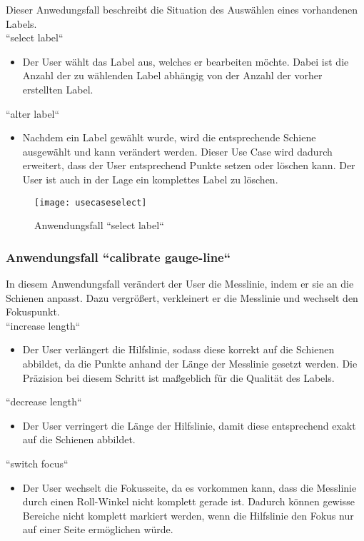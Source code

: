 Dieser Anwedungsfall beschreibt die Situation des Auswählen eines vorhandenen Labels. 
\\

\noindent
``select label``
\begin{itemize}
	\item Der User wählt das Label aus, welches er bearbeiten möchte. Dabei ist die Anzahl der zu wählenden Label abhängig von der Anzahl der vorher erstellten Label.
\end{itemize}

\noindent
``alter label``
\begin{itemize}
	\item Nachdem ein Label gewählt wurde, wird die entsprechende Schiene ausgewählt und kann verändert werden. Dieser Use Case wird dadurch erweitert, dass der User entsprechend Punkte setzen oder löschen  kann. Der User ist auch in der Lage ein komplettes Label zu löschen.
\end{itemize}


\begin{figure}[H]
  \texttt{[image: usecaseselect]}
  \caption{Anwendungsfall ``select label``}
\end{figure}


\subsubsection{Anwendungsfall ``calibrate gauge-line``}
\label{sec:Anwendungsfall ``calibrate helpbar`` }

In diesem Anwendungsfall verändert der User die Messlinie, indem er sie an die Schienen anpasst. Dazu vergrößert, verkleinert er die Messlinie und wechselt den Fokuspunkt.
\\

\noindent
``increase length``
\begin{itemize}
	\item Der User verlängert die Hilfslinie, sodass diese korrekt auf die Schienen abbildet, da die Punkte anhand der Länge der Messlinie gesetzt werden. Die Präzision bei diesem Schritt ist maßgeblich für die Qualität des Labels.
\end{itemize}
\noindent
``decrease length``
\begin{itemize}
	\item Der User verringert die Länge der Hilfslinie, damit diese entsprechend exakt auf die Schienen abbildet. 
\end{itemize}
\noindent
``switch focus``
\begin{itemize}
	\item Der User wechselt die Fokusseite, da es vorkommen kann, dass die Messlinie durch einen Roll-Winkel nicht komplett gerade ist. Dadurch können gewisse Bereiche nicht komplett markiert werden, wenn die Hilfslinie den Fokus nur auf einer Seite ermöglichen würde. 
\end{itemize}

